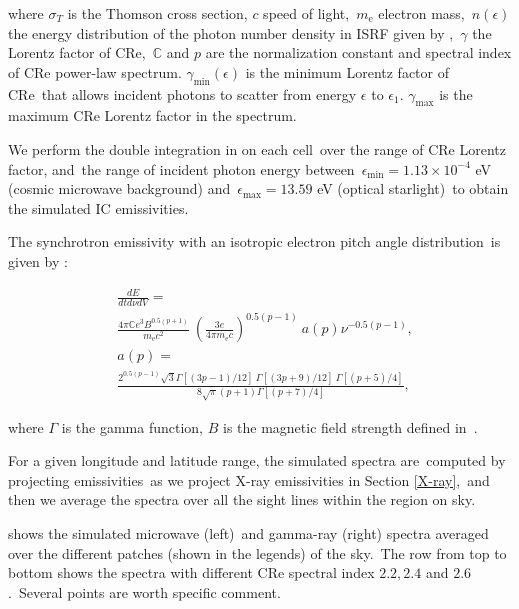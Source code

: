 \documentclass[twocolumn]{aastex631}
\begin{document}
where $\sigma_{T}$ is the Thomson cross section, $c$ speed of light,\
$m_{\text{e}}$ electron mass,\
$n(\epsilon)$ the energy distribution of the photon number density in ISRF given by \citet{Porter2017},\
$\gamma$ the Lorentz factor of CRe,\
$\mathbb{C}$ and $p$ are the normalization constant and spectral index of CRe power-law spectrum.
$\gamma_{\text{min}}(\epsilon)$ is the minimum Lorentz factor of CRe\
that allows incident photons to scatter from energy $\epsilon$ to $\epsilon_{1}$.
$\gamma_{\text{max}}$ is the maximum CRe Lorentz factor in the spectrum.

We perform the double integration in \Cref{gammaray-emissivity} on each cell\
over the range of CRe Lorentz factor, and\
the range of incident photon energy between\
$\epsilon_{\text{min}}=1.13\times10^{-4}$ eV (cosmic microwave background) and\
$\epsilon_{\text{max}}=13.59$ eV (optical starlight)\
to obtain the simulated IC emissivities.


The synchrotron emissivity with an isotropic electron pitch angle distribution\
is given by \citet{BLUMENTHAL1970}:

\begin{subequations}
   \begin{align}
      &\frac{dE}{dtd\nu dV} =\nonumber\\
      &\frac{4\pi\mathbb{C}e^{3}B^{0.5(p+1)}}{m_{\text{e}}c^{2}}\
      \left(\frac{3e}{4\pi m_{\text{e}}c}\right)^{0.5(p-1)}\
      a(p)\nu^{-0.5(p-1)},\\
      &a(p)=\nonumber\\
           &\frac{2^{0.5(p-1)}\sqrt{3}\Gamma\left[\left(3p-1\right)/12\right]\
                                      \Gamma\left[\left(3p+9\right)/12\right]\
                                      \Gamma\left[\left(p+5\right)/4\right]}
      {8\sqrt{\pi}(p+1)\Gamma\left[\left(p+7\right)/4\right]},
   \end{align}
   \label{synchrotron-emissivity}
\end{subequations}

where $\Gamma$ is the gamma function, $B$ is the magnetic field strength defined in\
.

For a given longitude and latitude range, the simulated spectra are\
computed by projecting emissivities\
as we project X-ray emissivities in Section \ref{X-ray},\
and then we average the spectra over all the sight lines within the region on sky.


 shows the simulated microwave (left)\
and gamma-ray (right) spectra averaged over the different patches (shown in the legends) of the sky.\
The row from top to bottom shows the spectra with different CRe spectral index $2.2, 2.4$ and $2.6$.\
Several points are worth specific comment.\
\end{document}
